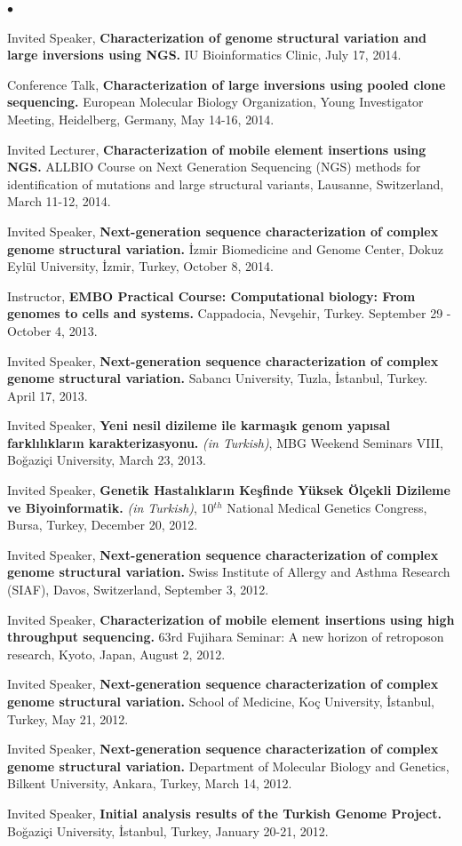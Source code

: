 \documentclass[margin,line]{res}
\newenvironment{list2}{
  \begin{list}{$\bullet$}{%
      \setlength{\itemsep}{0in}
      \setlength{\parsep}{0in} \setlength{\parskip}{0in}
      \setlength{\topsep}{0in} \setlength{\partopsep}{0in} 
      \setlength{\leftmargin}{0.2in}}}{\end{list}}
\begin{document}
\begin{resume}
\begin{list2}
\item
  Invited Speaker, 
  {\bf Characterization of  genome structural variation and large inversions using NGS.}
  IU Bioinformatics Clinic, July 17, 2014. 
\item
  Conference Talk, 
  {\bf Characterization of large inversions using pooled clone sequencing.}
  European Molecular Biology Organization, Young Investigator Meeting, Heidelberg, Germany, May 14-16, 2014.

\item
  Invited Lecturer, 
  {\bf Characterization of mobile element insertions using NGS.}
  ALLBIO Course on Next Generation Sequencing (NGS) methods for identification of mutations and large structural variants,
  Lausanne, Switzerland, March 11-12, 2014.
\item
  Invited Speaker, 
  {\bf  Next-generation sequence characterization of complex genome structural variation.}
  İzmir Biomedicine and Genome Center, Dokuz Eylül University, İzmir, Turkey, October 8, 2014.

\item 
  Instructor,
  {\bf EMBO Practical Course: Computational biology: From genomes to cells and systems.}
  Cappadocia, Nevşehir, Turkey. September 29 - October 4, 2013.
\item
  Invited Speaker, 
  {\bf  Next-generation sequence characterization of complex genome structural variation.}
  Sabancı University, Tuzla, İstanbul, Turkey. April 17, 2013.
\item
  Invited Speaker, 
  {\bf Yeni nesil dizileme ile karmaşık genom yapısal farklılıkların karakterizasyonu.} {\it (in Turkish)},
  MBG Weekend Seminars VIII, Boğaziçi University, March 23, 2013.  
\item
  Invited Speaker, 
  {\bf Genetik Hastalıkların Keşfinde Yüksek Ölçekli Dizileme ve Biyoinformatik.} {\it (in Turkish)},
  10$^{th}$ National Medical Genetics Congress, Bursa, Turkey,  December 20, 2012.
\item
  Invited Speaker, 
  {\bf  Next-generation sequence characterization of complex genome structural variation.}
  Swiss Institute of Allergy and Asthma Research (SIAF), Davos, Switzerland, September 3, 2012.
\item
  Invited Speaker, 
  {\bf Characterization of mobile element insertions using high throughput sequencing.}
  63rd Fujihara Seminar: A new horizon of retroposon research, Kyoto, Japan, August 2, 2012.
\item
  Invited Speaker, 
  {\bf  Next-generation sequence characterization of complex genome structural variation.}
  School of Medicine, Ko\c{c} University, \.{I}stanbul, Turkey, May 21, 2012.
\item
  Invited Speaker, 
  {\bf  Next-generation sequence characterization of complex genome structural variation.}
  Department of Molecular Biology and Genetics, Bilkent University, Ankara, Turkey, March 14, 2012.
\item
  Invited Speaker,
  {\bf Initial analysis results of the Turkish Genome Project.} 
Bo\u{g}azi\c{c}i University, \.{I}stanbul, Turkey, January 20-21, 2012.


\end{list2}
\end{resume}
\end{document}
